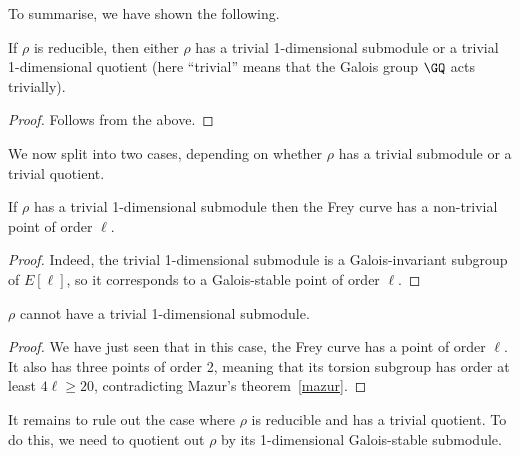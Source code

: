 To summarise, we have shown the following.
\begin{theorem}\label{Frey_curve_reducible_structure}\notready If $\rho$ is reducible, then either $\rho$
  has a trivial 1-dimensional submodule or a trivial 1-dimensional quotient (here ``trivial'' means
  that the Galois group $\GQ$ acts trivially).
\end{theorem}
\begin{proof} Follows from the above.
\end{proof}

We now split into two cases, depending on whether $\rho$ has a trivial submodule or a trivial quotient.

\begin{lemma}\label{Frey_curve_trivial_submodule} If $\rho$ has a trivial 1-dimensional submodule then the
  Frey curve has a non-trivial point of order $\ell$.
\end{lemma}
\begin{proof} Indeed, the trivial 1-dimensional submodule is a Galois-invariant subgroup of $E[\ell]$, so
  it corresponds to a Galois-stable point of order $\ell$.
\end{proof}

\begin{corollary}\label{Frey_curve_no_trivial_submodule} $\rho$ cannot have a trivial 1-dimensional submodule.
\end{corollary}
\begin{proof}
  We have just seen that in this case, the Frey curve has a point of order $\ell$.
  It also has three points of order 2, meaning that its torsion subgroup has order at least
  $4\ell\geq 20$, contradicting Mazur's theorem~\ref{mazur}.
\end{proof}

It remains to rule out the case where $\rho$ is reducible and has a trivial quotient. To do this, we need
to quotient out $\rho$ by its 1-dimensional Galois-stable submodule.

